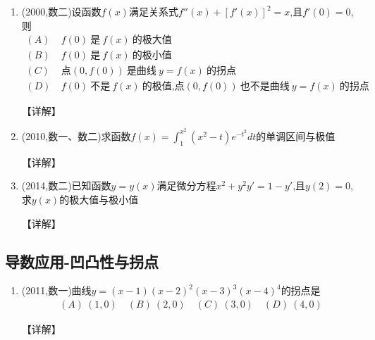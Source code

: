 \documentclass[12pt, a4paper, oneside, UTF8]{ctexbook}
\begin{document}
\begin{enumerate}[label=\arabic*.,start=17]
    \item  (2000,数二)设函数$f(x)$满足关系式$f''(x)+[f'(x)]^2=x$,且$f'(0)=0$,则
    \begin{align*}
        (A)&\ f(0)\ \text{是}\ f(x)\ \text{的极大值} \\
        (B)&\ f(0)\ \text{是}\ f(x)\ \text{的极小值} \\
        (C)&\ \text{点}(0,f(0))\ \text{是曲线}\ y=f(x)\ \text{的拐点} \\
        (D)&\ f(0)\ \text{不是}\ f(x)\ \text{的极值,点}(0,f(0))\ \text{也不是曲线}\ y=f(x)\ \text{的拐点}
    \end{align*}
    
    \begin{solution}
    【详解】
    \end{solution}
    
    \item  (2010,数一、数二)求函数$f(x)=\int_1^{x^2}(x^2-t)e^{-t^2}dt$的单调区间与极值
    
    \begin{solution}
    【详解】
    \end{solution}
    
    \item  (2014,数二)已知函数$y=y(x)$满足微分方程$x^2+y^2y'=1-y'$,且$y(2)=0$,求$y(x)$的极大值与极小值
    
    \begin{solution}
    【详解】
    \end{solution}
\end{enumerate}

\subsection{导数应用-凹凸性与拐点}

\begin{enumerate}[label=\arabic*.,start=20]
    \item  (2011,数一)曲线$y=(x-1)(x-2)^2(x-3)^3(x-4)^4$的拐点是
    \begin{align*}
        (A)\ (1,0) \quad (B)\ (2,0) \quad (C)\ (3,0) \quad (D)\ (4,0)
    \end{align*}
    
    \begin{solution}
    【详解】
    \end{solution}
\end{enumerate}
\end{document}
